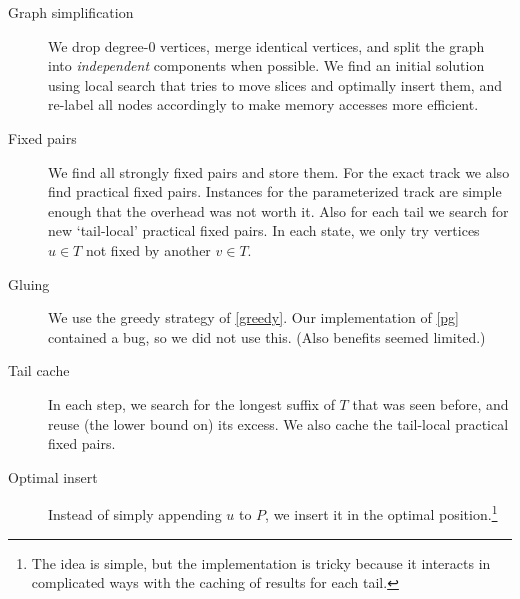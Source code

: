 \documentclass[a4paper,UKenglish,cleveref, autoref, thm-restate]{lipics-v2021}
\begin{document}
\begin{description}
  \item[Graph simplification] We drop degree-$0$ vertices, merge identical
    vertices, and split the graph into \emph{independent} components when
    possible. We find an initial solution using local search that tries to move
    slices and optimally insert them, and re-label all nodes accordingly to make
    memory accesses more efficient.
  \item[Fixed pairs] We find all strongly fixed pairs and store them. For the
    exact track we also find practical fixed pairs. Instances for the parameterized
    track are simple enough that the overhead was not worth it. Also for each
    tail we search for new `tail-local' practical fixed pairs. In each state, we only
    try vertices $u\in T$ not fixed by another $v\in T$.
  \item[Gluing] We use the greedy strategy of \cref{greedy}. Our implementation
    of \cref{pg} contained a bug, so we did not use this. (Also benefits
    seemed limited.)
  \item[Tail cache] In each step, we search for the longest suffix of $T$ that
    was seen before, and reuse (the lower bound on) its excess. We also
    cache the tail-local practical fixed pairs.
  \item[Optimal insert] Instead of simply appending $u$ to $P$, we
    insert it in the optimal position.\footnote{The idea is simple, but the
    implementation is tricky because it interacts in complicated ways with
    the caching of results for each tail.}
\end{description}
\end{document}

